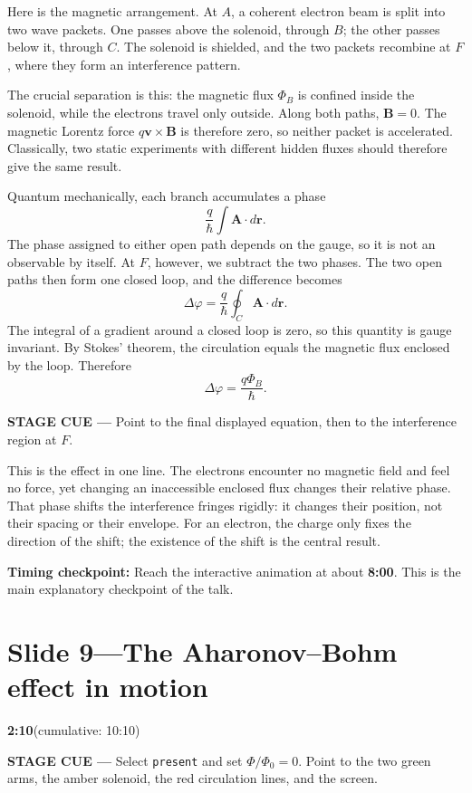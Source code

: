 \documentclass[a4paper,11pt]{article}
\newcommand{\slidetime}[2]{%
  {\small\sffamily\color{timegreen}\textbf{#1}\enspace(cumulative: #2)}%
}
\newcommand{\cue}[1]{%
  \par\smallskip
  \noindent
  {\small\sffamily\color{cueblue}\textbf{STAGE CUE ---} #1}
  \par\smallskip
}
\newcommand{\checkpoint}[1]{%
  \par\smallskip
  \noindent
  \colorbox{softgray}{%
    \parbox{0.965\linewidth}{%
      \small\sffamily\color{textgray}\textbf{Timing checkpoint:} #1}}
  \par\smallskip
}
\newenvironment{spoken}{%
  \begin{list}{}{%
    \setlength{\leftmargin}{1.1em}%
    \setlength{\rightmargin}{1.1em}%
    \setlength{\topsep}{2pt}%
    \setlength{\partopsep}{0pt}%
    \setlength{\parsep}{5pt}%
    \setlength{\itemsep}{0pt}}%
  \item\relax
}{\end{list}}
\newcommand{\slideheading}[4]{%
  \needspace{10\baselineskip}
  \section*{#1\enspace---\enspace#2}
  \vspace{-0.7em}
  \noindent\slidetime{#3}{#4}\par\smallskip
}
\begin{document}
\begin{spoken}
Here is the magnetic arrangement. At \(A\), a coherent electron beam is split
into two wave packets. One passes above the solenoid, through \(B\); the other
passes below it, through \(C\). The solenoid is shielded, and the two packets
recombine at \(F\), where they form an interference pattern.

The crucial separation is this: the magnetic flux \(\Phi_B\) is confined
inside the solenoid, while the electrons travel only outside. Along both
paths, \(\mathbf B=0\). The magnetic Lorentz force
\(q\mathbf v\times\mathbf B\) is therefore zero, so neither packet is
accelerated. Classically, two static experiments with different hidden fluxes
should therefore give the same result.

Quantum mechanically, each branch accumulates a phase
\[
  \frac{q}{\hbar}\int \mathbf A\cdot d\mathbf r.
\]
The phase assigned to either open path depends on the gauge, so it is not an
observable by itself. At \(F\), however, we subtract the two phases. The two
open paths then form one closed loop, and the difference becomes
\[
  \Delta\varphi
  =\frac{q}{\hbar}\oint_C \mathbf A\cdot d\mathbf r.
\]
The integral of a gradient around a closed loop is zero, so this quantity is
gauge invariant. By Stokes' theorem, the circulation equals the magnetic flux
enclosed by the loop. Therefore
\[
  \Delta\varphi=\frac{q\Phi_B}{\hbar}.
\]
\end{spoken}

\cue{Point to the final displayed equation, then to the interference region at \(F\).}

\begin{spoken}
This is the effect in one line. The electrons encounter no magnetic field and
feel no force, yet changing an inaccessible enclosed flux changes their
relative phase. That phase shifts the interference fringes rigidly: it changes
their position, not their spacing or their envelope. For an electron, the
charge only fixes the direction of the shift; the existence of the shift is
the central result.
\end{spoken}

\checkpoint{Reach the interactive animation at about \textbf{8:00}. This is
the main explanatory checkpoint of the talk.}


\slideheading{Slide 9}{The Aharonov--Bohm effect in motion}{2:10}{10:10}

\cue{Select \texttt{present} and set \(\Phi/\Phi_0=0\). Point to the two green
arms, the amber solenoid, the red circulation lines, and the screen.}
\end{document}
